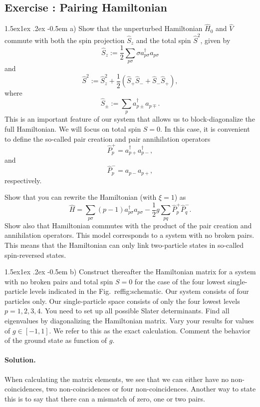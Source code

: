 \documentclass[%
twoside,                 %
final,                   %
10pt]{article}
\makeatletter
\newenvironment{doconceexercise}{}{}
\newcounter{doconceexercisecounter}
\newcommand\subex{\@startsection{paragraph}{4}{\z@}%
                  {1.5ex\@plus1ex \@minus.2ex}%
                  {-0.5em}%
                  {\normalfont\normalsize\bfseries}}
\makeatother
\begin{document}
\begin{doconceexercise}

\subsection*{Exercise \thedoconceexercisecounter: Pairing Hamiltonian}



\subex{a)}
Show that the unperturbed Hamiltonian $\hat{H}_0$ and $\hat{V}$
  commute with both the spin projection $\hat{S}_z$ and the total spin
  $\hat{S}^2$, given by
\[
  \hat{S}_z := \frac{1}{2}\sum_{p\sigma} \sigma
  a^\dag_{p\sigma}a_{p\sigma}
\]
and
\[
  \hat{S}^2 := \hat{S}_z^2 + \frac{1}{2}(\hat{S}_+\hat{S}_- +
  \hat{S}_-\hat{S}_+),
\]
where
\[
  \hat{S}_\pm := \sum_{p} a^\dag_{p\pm} a_{p\mp}.
\]
This is an important feature of our system that allows us to
block-diagonalize the full Hamiltonian. We will focus on total spin
$S=0$.  In this case, it is convenient to define the so-called pair
creation and pair annihilation operators
\[
\hat{P}^{+}_p = a^\dag_{p+}a^\dag_{p-},
\]
and
\[
\hat{P}^{-}_p = a_{p-}a_{p+},
\] 
respectively.

Show that you can rewrite the Hamiltonian (with $\xi=1$) as
\[
\hat{H}=\sum_{p\sigma}(p-1)a_{p\sigma}^{\dagger}a_{p\sigma}
-\frac{1}{2}g\sum_{pq}\hat{P}^{+}_p\hat{P}^{-}_q.
\]
Show also that Hamiltonian commutes with the product of the pair
creation and annihilation operators.  This model corresponds to a
system with no broken pairs. This means that the Hamiltonian can only
link two-particle states in so-called spin-reversed states.


\subex{b)}
Construct thereafter the Hamiltonian matrix for a system with no
  broken pairs and total spin $S=0$ for the case of the four lowest
  single-particle levels indicated in the
  Fig.~ref{fig:schematic}. Our system consists of four particles
  only.  Our single-particle space consists of only the four lowest
  levels $p=1,2,3,4$.  You need to set up all possible Slater
  determinants.  Find all eigenvalues by diagonalizing the Hamiltonian
  matrix.  Vary your results for values of $g\in [-1,1]$.  We refer to
  this as the exact calculation. Comment the behavior of the ground
  state as function of $g$.


\paragraph{Solution.}
When calculating the matrix elements, we see that we can either have no non-coincidences, two non-coincidences or four non-coincidences. Another way to state this is to say that there can a mismatch of zero, one or two pairs. 


\end{doconceexercise}
\end{document}
